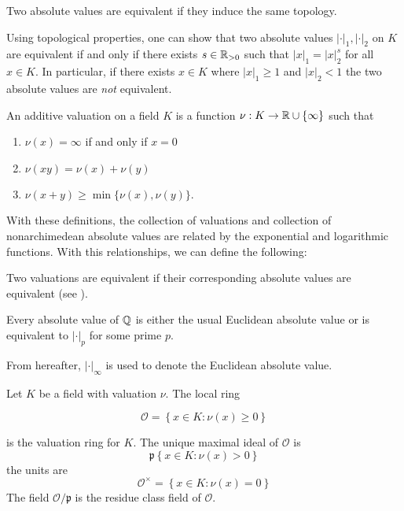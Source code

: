 \begin{definition}[Equivalent]
    Two absolute values are equivalent if they induce the same topology.
\end{definition}

Using topological properties, one can show that two absolute values $|\cdot|_1, |\cdot|_2$ on $K$ are equivalent if and only if there exists $s \in \mathbb{R}_{>0}$ such that $|x|_1 = |x|_2^s$ for all $x \in K$. In particular, if there exists $x \in K$ where $|x|_1 \geq 1$ and $|x|_2 < 1$ the two absolute values are \emph{not} equivalent.

\begin{definition}
    An additive valuation on a field $K$ is a function $\nu: K \to \mathbb{R} \cup \{\infty\}$ such that 
    \begin{enumerate}[(1)]
        \item $\nu(x) = \infty$ if and only if  $x = 0$
        \item $\nu(xy) = \nu(x) + \nu(y)$
        \item $\nu(x+y) \geq \min\{\nu(x), \nu(y)\}$.
    \end{enumerate}
\end{definition}

With these definitions, the collection of valuations and collection of nonarchimedean absolute values are related by the exponential and logarithmic functions. With this relationships, we can define the following:

\begin{definition}
    Two valuations are equivalent if their corresponding absolute values are equivalent (see ).
\end{definition}

\begin{proposition}
    Every absolute value of $\mathbb{Q}$ is either the usual Euclidean absolute value or is equivalent to $|\cdot|_p$ for some prime $p$.
\end{proposition}

From hereafter, $|\cdot|_\infty$ is used to denote the Euclidean absolute value.

\begin{definition}
    Let $K$ be a field with valuation $\nu$. The local ring 

    \[ \mathcal{O} = \left\{x \in K: \nu(x) \geq 0\right\}\]

    is the valuation ring for $K$. The unique maximal ideal of $\mathcal{O}$ is 
        \[\mathfrak{p} \left\{x \in K: \nu(x) > 0\right\}\]
    the units are
        \[\mathcal{O}^\times = \left\{x \in K : \nu(x) = 0\right\}\]
    The field $\mathcal{O}/\mathfrak{p}$ is the residue class field of $\mathcal{O}$.
\end{definition}

